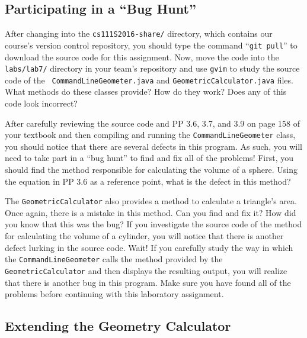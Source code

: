 \vspace*{-.1in}
\subsection*{Participating in a ``Bug Hunt''}

After changing into the {\tt cs111S2016-share/} directory, which contains our course's version control repository, you
should type the command ``{\tt git pull}'' to download the source code for this assignment. Now, move the code into the
{\tt labs/lab7/} directory in your team's repository and use {\tt gvim} to study the source code of the {\tt
CommandLineGeometer.java} and {\tt GeometricCalculator.java} files. What methods do these classes provide? How do they
work? Does any of this code look incorrect?

After carefully reviewing the source code and PP 3.6, 3.7, and 3.9 on page 158 of your textbook and then compiling and
running the {\tt CommandLineGeometer} class, you should notice that there are several defects in this program. As
such, you will need to take part in a ``bug hunt'' to find and fix all of the problems! First, you should find the
method responsible for calculating the volume of a sphere. Using the equation in PP 3.6 as a reference point, what is
the defect in this method?

The {\tt GeometricCalculator} also provides a method to calculate a triangle's area.  Once again, there is a
mistake in this method.  Can you find and fix it? How did you know that this was the bug? If you investigate the source
code of the method for calculating the volume of a cylinder, you will notice that there is another defect lurking in the
source code. Wait! If you carefully study the way in which the {\tt CommandLineGeometer} calls the method
provided by the {\tt GeometricCalculator} and then displays the resulting output, you will realize that there is another
bug in this program. Make sure you have found all of the problems before continuing with this laboratory assignment.

\vspace*{-.1in}
\subsection*{Extending the Geometry Calculator}
\vspace*{-.05in}

